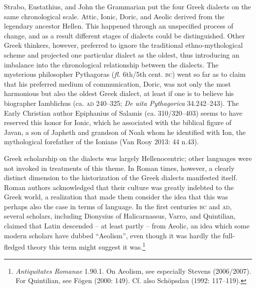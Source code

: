\documentclass[12pt]{article}
\newenvironment{styleStandard}{\renewcommand\baselinestretch{1.25}\setlength\leftskip{0in}\setlength\rightskip{0in}\setlength\parindent{0.1972in}\setlength\parfillskip{0pt plus 1fil}\setlength\parskip{0in plus 1pt}\writerlistparindent\writerlistleftskip\leavevmode\normalfont\normalsize\writerlistlabel\ignorespaces}{\unskip\vspace{0in plus 1pt}\par}
\newcommand\writerlistleftskip{}
\newcommand\writerlistparindent{}
\newcommand\writerlistlabel{}
\begin{document}
\begin{styleStandard}
Strabo, Eustathius, and John the Grammarian put the four Greek dialects on the same chronological scale. Attic, Ionic, Doric, and Aeolic derived from the legendary ancestor Hellen. This happened through an unspecified process of change, and as a result different stages of dialects could be distinguished. Other Greek thinkers, however, preferred to ignore the traditional ethno-mythological scheme and projected one particular dialect as the oldest, thus introducing an imbalance into the chronological relationship between the dialects. The mysterious philosopher Pythagoras (\textit{fl.} 6th/5th cent. \textsc{bc}) went so far as to claim that his preferred medium of communication, Doric, was not only the most harmonious but also the oldest Greek dialect, at least if one is to believe his biographer Iamblichus (ca. \textsc{ad} 240–325; \textit{De uita Pythagorica} 34.242–243). The Early Christian author Epiphanius of Salamis (ca. 310/320–403) seems to have reserved this honor for Ionic, which he associated with the biblical figure of Javan, a son of Japheth and grandson of Noah whom he identified with Ion, the mythological forefather of the Ionians (Van Rooy 2013: 44 n.43).
\end{styleStandard}

\begin{styleStandard}
Greek scholarship on the dialects was largely Hellenocentric; other languages were not invoked in treatments of this theme. In Roman times, however, a clearly distinct dimension to the historization of the Greek dialects manifested itself. Roman authors acknowledged that their culture was greatly indebted to the Greek world, a realization that made them consider the idea that this was perhaps also the case in terms of language. In the first centuries \textsc{bc} and \textsc{ad}, several scholars, including Dionysius of Halicarnassus, Varro, and Quintilian, claimed that Latin descended – at least partly – from Aeolic, an idea which some modern scholars have dubbed “Aeolism”, even though it was hardly the full-fledged theory this term might suggest it was.\footnote{ \textit{Antiquitates Romanae} 1.90.1. On Aeolism, see especially Stevens (2006/2007). For Quintilian, see Fögen (2000: 149). Cf. also Schöpsdau (1992: 117–119).}
\end{styleStandard}
\end{document}
